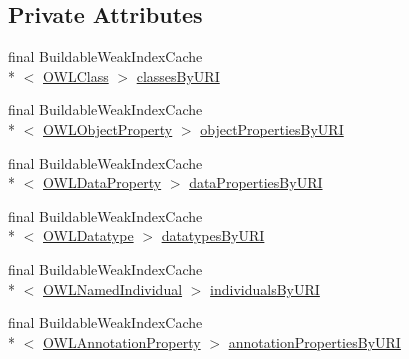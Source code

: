 \subsection*{Private Attributes}
\begin{DoxyCompactItemize}
\item 
final Buildable\-Weak\-Index\-Cache\\*
$<$ \hyperlink{interfaceorg_1_1semanticweb_1_1owlapi_1_1model_1_1_o_w_l_class}{O\-W\-L\-Class} $>$ \hyperlink{classuk_1_1ac_1_1manchester_1_1cs_1_1owl_1_1owlapi_1_1_o_w_l_data_factory_internals_impl_a6955ef96fe48019e017ce666f6d53773}{classes\-By\-U\-R\-I}
\item 
final Buildable\-Weak\-Index\-Cache\\*
$<$ \hyperlink{interfaceorg_1_1semanticweb_1_1owlapi_1_1model_1_1_o_w_l_object_property}{O\-W\-L\-Object\-Property} $>$ \hyperlink{classuk_1_1ac_1_1manchester_1_1cs_1_1owl_1_1owlapi_1_1_o_w_l_data_factory_internals_impl_a66f4c435a6e0b5fc66a7f73e3159304a}{object\-Properties\-By\-U\-R\-I}
\item 
final Buildable\-Weak\-Index\-Cache\\*
$<$ \hyperlink{interfaceorg_1_1semanticweb_1_1owlapi_1_1model_1_1_o_w_l_data_property}{O\-W\-L\-Data\-Property} $>$ \hyperlink{classuk_1_1ac_1_1manchester_1_1cs_1_1owl_1_1owlapi_1_1_o_w_l_data_factory_internals_impl_a3d8c475cbdf00739ada62d58e66a128d}{data\-Properties\-By\-U\-R\-I}
\item 
final Buildable\-Weak\-Index\-Cache\\*
$<$ \hyperlink{interfaceorg_1_1semanticweb_1_1owlapi_1_1model_1_1_o_w_l_datatype}{O\-W\-L\-Datatype} $>$ \hyperlink{classuk_1_1ac_1_1manchester_1_1cs_1_1owl_1_1owlapi_1_1_o_w_l_data_factory_internals_impl_af73fd03cbceadc1cd2eb8a11bea0cfed}{datatypes\-By\-U\-R\-I}
\item 
final Buildable\-Weak\-Index\-Cache\\*
$<$ \hyperlink{interfaceorg_1_1semanticweb_1_1owlapi_1_1model_1_1_o_w_l_named_individual}{O\-W\-L\-Named\-Individual} $>$ \hyperlink{classuk_1_1ac_1_1manchester_1_1cs_1_1owl_1_1owlapi_1_1_o_w_l_data_factory_internals_impl_a2eae6279119587b540f235659226692b}{individuals\-By\-U\-R\-I}
\item 
final Buildable\-Weak\-Index\-Cache\\*
$<$ \hyperlink{interfaceorg_1_1semanticweb_1_1owlapi_1_1model_1_1_o_w_l_annotation_property}{O\-W\-L\-Annotation\-Property} $>$ \hyperlink{classuk_1_1ac_1_1manchester_1_1cs_1_1owl_1_1owlapi_1_1_o_w_l_data_factory_internals_impl_a90f66392fff0ca2bac5ecc0fc6a0a7ad}{annotation\-Properties\-By\-U\-R\-I}

\end{DoxyCompactItemize}
